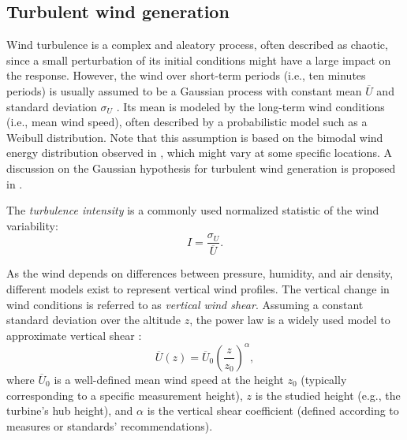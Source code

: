 \subsection{Turbulent wind generation}\label{sec:221}

Wind turbulence is a complex and aleatory process, often described as chaotic, since a small perturbation of its initial conditions might have a large impact on the response. 
However, the wind over short-term periods (i.e., ten minutes periods) is usually assumed to be a Gaussian process with constant mean $\overline{U}$ and standard deviation $\sigma_U$ \citep{burton_2021_wind_handbook}. 
Its mean is modeled by the long-term wind conditions (i.e., mean wind speed), often described by a probabilistic model such as a Weibull distribution. 
Note that this assumption is based on the bimodal wind energy distribution observed in , which might vary at some specific locations. 
A discussion on the Gaussian hypothesis for turbulent wind generation is proposed in \citet[Sec. 7]{hiperwind_2022_wp31}.

The \textit{turbulence intensity} is a commonly used normalized statistic of the wind variability: 
\begin{equation}
    I = \frac{\sigma_U}{\overline{U}}.
\end{equation}


As the wind depends on differences between pressure, humidity, and air density, different models exist to represent vertical wind profiles. 
The vertical change in wind conditions is referred to as \textit{vertical wind shear}. 
Assuming a constant standard deviation over the altitude $z$, the power law is a widely used model to approximate vertical shear \citep{iec_2019}:
\begin{equation}
    \overline{U}(z) = \overline{U}_0 \left(\frac{z}{z_{\mathrm{0}}}\right)^\alpha,
\end{equation}
where $\overline{U}_0$ is a well-defined mean wind speed at the height $z_{\mathrm{0}}$ (typically corresponding to a specific measurement height), 
$z$ is the studied height (e.g., the turbine's hub height), and $\alpha$ is the vertical shear coefficient (defined according to measures or standards' recommendations). 


